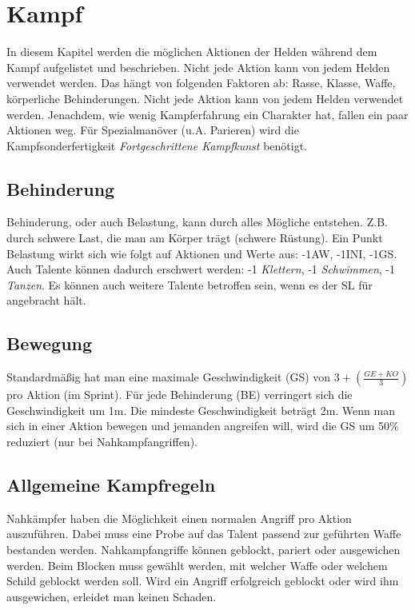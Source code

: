 {\let\clearpage\relax\chapter{Kampf}}
In diesem Kapitel werden die möglichen Aktionen der Helden während dem Kampf aufgelistet und beschrieben. Nicht jede Aktion kann von jedem Helden verwendet werden. Das hängt von folgenden Faktoren ab: Rasse, Klasse, Waffe, körperliche Behinderungen. Nicht jede Aktion kann von jedem Helden verwendet werden. Jenachdem, wie wenig Kampferfahrung ein Charakter hat, fallen ein paar Aktionen weg. Für Spezialmanöver (u.A. Parieren) wird die Kampfsonderfertigkeit \textit{Fortgeschrittene Kampfkunst} benötigt.

\section{Behinderung}
Behinderung, oder auch Belastung, kann durch alles Mögliche entstehen. Z.B. durch schwere Last, die man am Körper trägt (schwere Rüstung). Ein Punkt Belastung wirkt sich wie folgt auf Aktionen und Werte aus: -1AW, -1INI, -1GS. Auch Talente können dadurch erschwert werden: -1 \textit{Klettern}, -1 \textit{Schwimmen}, -1 \textit{Tanzen}. Es können auch weitere Talente betroffen sein, wenn es der SL für angebracht hält.

\section{Bewegung}
Standardmäßig hat man eine maximale Geschwindigkeit (GS) von $3+(\frac{GE+KO}{3})$ pro Aktion (im Sprint). Für jede Behinderung (BE) verringert sich die Geschwindigkeit um 1m. Die mindeste Geschwindigkeit beträgt 2m. Wenn man sich in einer Aktion bewegen und jemanden angreifen will, wird die GS um 50\% reduziert (nur bei Nahkampfangriffen). 

\section{Allgemeine Kampfregeln}
Nahkämpfer haben die Möglichkeit einen normalen Angriff pro Aktion auszuführen. Dabei muss eine Probe auf das Talent passend zur geführten Waffe bestanden werden. Nahkampfangriffe können geblockt, pariert oder ausgewichen werden. Beim Blocken muss gewählt werden, mit welcher Waffe oder welchem Schild geblockt werden soll. Wird ein Angriff erfolgreich geblockt oder wird ihm ausgewichen, erleidet man keinen Schaden.

